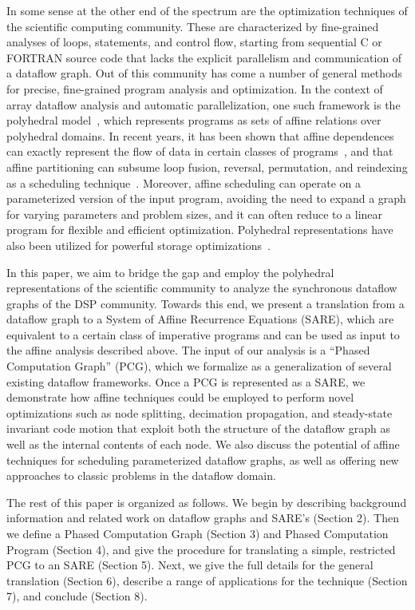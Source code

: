 In some sense at the other end of the spectrum are the optimization
techniques of the scientific computing community.  These are
characterized by fine-grained analyses of loops, statements, and
control flow, starting from sequential C or FORTRAN source code that
lacks the explicit parallelism and communication of a dataflow graph.
Out of this community has come a number of general methods for
precise, fine-grained program analysis and optimization.  In the
context of array dataflow analysis and automatic parallelization, one
such framework is the polyhedral model~\cite{DRV00}, which represents
programs as sets of affine relations over polyhedral domains. In
recent years, it has been shown that affine dependences can exactly
represent the flow of data in certain classes of
programs~\cite{Feautrier92i}, and that affine partitioning can subsume
loop fusion, reversal, permutation, and reindexing as a scheduling
technique~\cite{Lim98}.  Moreover, affine scheduling can operate on a
parameterized version of the input program, avoiding the need to
expand a graph for varying parameters and problem sizes, and it can
often reduce to a linear program for flexible and efficient
optimization.  Polyhedral representations have also been utilized for
powerful storage
optimizations~\cite{Lim01,Quillere,Thies01,Lefebvre98}.

In this paper, we aim to bridge the gap and employ the polyhedral
representations of the scientific community to analyze the synchronous
dataflow graphs of the DSP community.  Towards this end, we present a
translation from a dataflow graph to a System of Affine Recurrence
Equations (SARE), which are equivalent to a certain class of
imperative programs and can be used as input to the affine analysis
described above.  The input of our analysis is a ``Phased Computation
Graph'' (PCG), which we formalize as a generalization of several
existing dataflow frameworks.  Once a PCG is represented as a SARE, we
demonstrate how affine techniques could be employed to perform novel
optimizations such as node splitting, decimation propagation, and
steady-state invariant code motion that exploit both the structure of
the dataflow graph as well as the internal contents of each node.  We
also discuss the potential of affine techniques for scheduling
parameterized dataflow graphs, as well as offering new approaches to
classic problems in the dataflow domain.

The rest of this paper is organized as follows.  We begin by
describing background information and related work on dataflow graphs
and SARE's (Section 2).  Then we define a Phased Computation Graph
(Section 3) and Phased Computation Program (Section 4), and give the
procedure for translating a simple, restricted PCG to an SARE (Section
5).  Next, we give the full details for the general translation
(Section 6), describe a range of applications for the technique
(Section 7), and conclude (Section 8).
